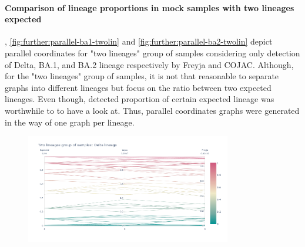         \paragraph{Comparison of lineage proportions in mock samples with two lineages expected} \label{sec:appendix:figures:parallel-twolin}
        , \cref{fig:further:parallel-ba1-twolin} and \cref{fig:further:parallel-ba2-twolin} depict parallel coordinates for "two lineages" group of samples considering only detection of Delta, BA.1, and BA.2 lineage respectively by Freyja and COJAC. Although, for the "two lineages" group of samples, it is not that reasonable to separate graphs into different lineages but focus on the ratio between two expected lineages. Even though, detected proportion of certain expected lineage was worthwhile to to have a look at. Thus, parallel coordinates graphs were generated in the way of one graph per lineage.
        \begin{figure}[H]
        	\centering
            \includegraphics[width=0.8\textwidth]{figures/further/pc-twolin-delta.png}
            \label{fig:further:parallel-delta-twolin}
        \end{figure}
